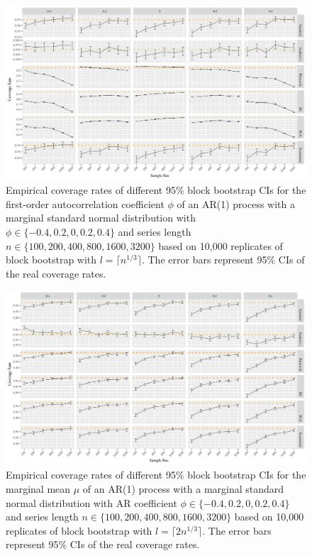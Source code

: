\documentclass[10pt]{article}
\begin{document}
\begin{figure}[tbp]
  \centering
  \includegraphics[width=\textwidth]{figures/plot_norm_phi_1}
  \caption{Empirical coverage rates of different 95\% block bootstrap CIs for 
    the first-order autocorrelation coefficient $\phi$ of an AR(1) process with 
    a marginal standard normal distribution with 
    $\phi \in \{-0.4, 0.2, 0, 0.2, 0.4\}$ and series length
    $n \in \{100, 200, 400, 800, 1600, 3200\}$ based on 10,000 replicates of
    block bootstrap with $l = \lceil n^{1/3} \rceil$. The
    error bars represent 95\% CIs of the real coverage rates.}
  \label{fig:phi1}
\end{figure}


\begin{figure}[tbp]
  \centering
  \includegraphics[width=\textwidth]{figures/plot_norm_mu_2}
  \caption{Empirical coverage rates of different 95\% block bootstrap CIs for
    the marginal mean $\mu$ of an AR(1) process with a marginal standard 
    normal distribution with AR coefficient
    $\phi \in \{-0.4, 0.2, 0, 0.2, 0.4\}$ and series length
    $n \in \{100, 200, 400, 800, 1600, 3200\}$ based on 10,000 replicates of
    block bootstrap with $l = \lceil 2n^{1/3} \rceil$. The
    error bars represent 95\% CIs of the real coverage rates.}
  \label{fig:mu2}
\end{figure}
\end{document}
